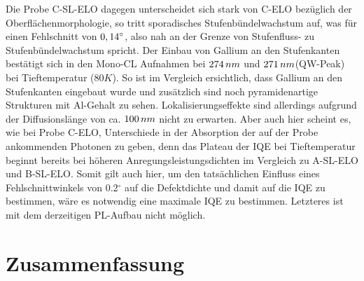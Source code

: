 Die Probe C-SL-ELO dagegen unterscheidet sich stark von C-ELO bezüglich der Oberflächenmorphologie, so tritt sporadisches Stufenbündelwachstum auf, was für einen Fehlschnitt von $0,14 \degree$, also nah an der Grenze von Stufenfluss- zu Stufenbündelwachstum spricht. Der Einbau von Gallium an den Stufenkanten bestätigt sich in den Mono-CL Aufnahmen bei $274 \thinspace nm$ und $271 \thinspace nm$(QW-Peak) bei Tieftemperatur ($80K$). So ist im Vergleich ersichtlich, dass Gallium an den Stufenkanten eingebaut wurde und zusätzlich sind noch pyramidenartige Strukturen mit Al-Gehalt zu sehen. Lokalisierungseffekte sind allerdings aufgrund der Diffusionslänge von ca. $100 \thinspace nm$ nicht zu erwarten. Aber auch hier scheint es, wie bei Probe C-ELO, Unterschiede in der Absorption der auf der Probe ankommenden Photonen zu geben, denn das Plateau der IQE bei Tieftemperatur beginnt bereits bei höheren Anregungsleistungsdichten im Vergleich zu A-SL-ELO und B-SL-ELO. Somit gilt auch hier, um den tatsächlichen Einfluss eines Fehlschnittwinkels von 0.2$^\circ$ auf die Defektdichte und damit auf die IQE zu bestimmen, wäre es notwendig eine maximale IQE zu bestimmen. Letzteres ist mit dem derzeitigen PL-Aufbau nicht möglich.


\section{Zusammenfassung}

